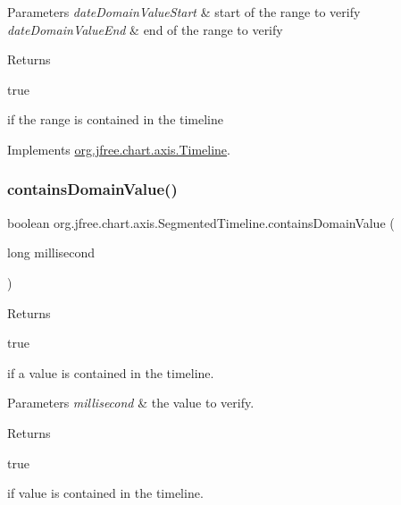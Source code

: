 \begin{DoxyParams}{Parameters}
{\em date\+Domain\+Value\+Start} & start of the range to verify \\
\hline
{\em date\+Domain\+Value\+End} & end of the range to verify\\
\hline
\end{DoxyParams}
\begin{DoxyReturn}{Returns}

\begin{DoxyCode}
\textcolor{keyword}{true} 
\end{DoxyCode}
 if the range is contained in the timeline 
\end{DoxyReturn}


Implements \mbox{\hyperlink{interfaceorg_1_1jfree_1_1chart_1_1axis_1_1_timeline_a9338cd3f5d7956c15d9716d4b1e4e5e8}{org.\+jfree.\+chart.\+axis.\+Timeline}}.

\mbox{\label{classorg_1_1jfree_1_1chart_1_1axis_1_1_segmented_timeline_aac440eed1b4484e0092a4bb041ef460c}} 
\subsubsection{\texorpdfstring{contains\+Domain\+Value()}{containsDomainValue()}\hspace{0.1cm}{\footnotesize\ttfamily [1/2]}}
{\footnotesize\ttfamily boolean org.\+jfree.\+chart.\+axis.\+Segmented\+Timeline.\+contains\+Domain\+Value (\begin{DoxyParamCaption}\item[{long}]{millisecond }\end{DoxyParamCaption})}

Returns
\begin{DoxyCode}
\textcolor{keyword}{true} 
\end{DoxyCode}
 if a value is contained in the timeline.


\begin{DoxyParams}{Parameters}
{\em millisecond} & the value to verify.\\
\hline
\end{DoxyParams}
\begin{DoxyReturn}{Returns}

\begin{DoxyCode}
\textcolor{keyword}{true} 
\end{DoxyCode}
 if value is contained in the timeline. 
\end{DoxyReturn}


